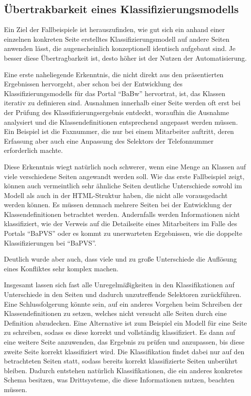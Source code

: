 \subsection{Übertrakbarkeit eines Klassifizierungsmodells}
    Ein Ziel der Fallbeispiele ist herauszufinden,
    wie gut sich ein anhand einer einzelnen konkreten Seite
    erstelltes Klassifizierungsmodell auf andere Seiten anwenden lässt,
    die augenscheinlich konzeptionell identisch aufgebaut sind.
    Je besser diese Übertragbarkeit ist,
    desto höher ist der Nutzen der Automatisierung.

    Eine erste naheliegende Erkenntnis,
    die nicht direkt aus den präsentierten Ergebnissen hervorgeht,
    aber schon bei der Entwicklung des Klassifizierungsmodells
    für das Portal "`BaBw"' hervortrat, ist,
    das Klassen iterativ zu definieren sind.
    Ausnahmen innerhalb einer Seite werden oft erst
    bei der Prüfung des Klassifizierungsergebnis entdeckt,
    woraufhin die Ausnahme analysiert und die Klassendefinitionen
    entsprechend angepasst werden müssen.
    Ein Beispiel ist die Faxnummer, die nur bei einem Mitarbeiter auftritt,
    deren Erfassung aber auch eine Anpassung des Selektors der Telefonnummer
    erforderlich machte.

    Diese Erkenntnis wiegt natürlich noch schwerer,
    wenn eine Menge an Klassen auf viele verschiedene Seiten angewandt werden soll.
    Wie das erste Fallbeispiel zeigt,
    können auch vermeintlich sehr ähnliche Seiten deutliche Unterschiede
    sowohl im Modell als auch in der HTML-Struktur haben,
    die nicht alle vorausgedacht werden können.
    Es müssen demnach mehrere Seiten bei der Entwicklung der Klassendefinitionen
    betrachtet werden.
    Andernfalls werden Informationen nicht klassifiziert,
    wie der Verweis auf die Detailseite eines Mitarbeiters im Falle des
    Portals "`BaPVS"' oder es kommt zu unerwarteten Ergebnissen,
    wie die doppelte Klassifizierungen bei "`BaPVS"'.

    Deutlich wurde aber auch, dass viele und zu große Unterschiede
    die Auflösung eines Konfliktes sehr komplex machen.

    Insgesamt lassen sich fast alle Unregelmäßigkeiten in den Klassifikationen
    auf Unterschiede in den Seiten und dadurch unzutreffende Selektoren zurückführen.
    Eine Schlussfolgerung könnte sein, auf ein anderes Vorgehen beim
    Schreiben der Klassendefinitionen zu setzen,
    welches nicht versucht alle Seiten durch eine Definition abzudecken.
    Eine Alternative ist zum Beispiel ein Modell für eine Seite zu schreiben,
    sodass es diese korrekt und vollständig klassifiziert.
    Es dann auf eine weitere Seite anzuwenden,
    das Ergebnis zu prüfen und anzupassen,
    bis diese zweite Seite korrekt klassifiziert wird.
    Die Klassifikation findet dabei nur auf den betrachteten Seiten statt,
    sodass bereits korrekt klassifizierte Seiten unberührt bleiben.
    Dadurch entstehen natürlich Klassifikationen,
    die ein anderes konkretes Schema besitzen,
    was Drittsysteme, die diese Informationen nutzen,
    beachten müssen.

